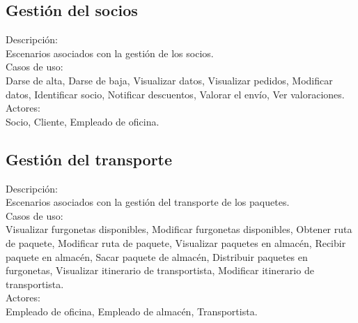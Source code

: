 \subsection{Gestión del socios}	
Descripción:\\
Escenarios asociados con la gestión de los socios.\\
Casos de uso:\\
 Darse de alta, Darse de baja, Visualizar datos, Visualizar pedidos, Modificar datos, Identificar socio, Notificar descuentos, Valorar el envío, Ver valoraciones.\\
Actores:\\
Socio, Cliente, Empleado de oficina.\\
\subsection{Gestión del transporte}	
Descripción:\\
Escenarios asociados con la gestión del transporte de los paquetes.\\
Casos de uso:\\
Visualizar furgonetas disponibles, Modificar furgonetas disponibles, Obtener ruta de paquete, Modificar ruta de paquete, Visualizar paquetes en almacén, Recibir paquete en almacén, Sacar paquete de almacén, Distribuir paquetes en furgonetas, Visualizar itinerario de transportista, Modificar itinerario de transportista.\\
Actores:\\
Empleado de oficina, Empleado de almacén, Transportista.\\

\newpage

